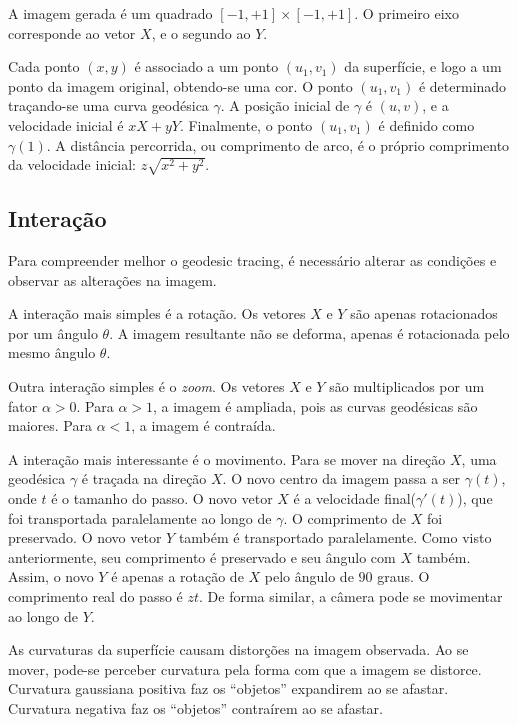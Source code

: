 A imagem gerada é um quadrado $[-1, +1] \times [-1, +1]$.
O primeiro eixo corresponde ao vetor $X$, e o segundo ao $Y$.

Cada ponto $(x,y)$ é associado a um ponto $(u_1, v_1)$ da superfície,
e logo a um ponto da imagem original, obtendo-se uma cor.
O ponto $(u_1, v_1)$ é determinado traçando-se uma curva geodésica $\gamma$.
A posição inicial de $\gamma$ é $(u,v)$, e a velocidade inicial é $xX+yY$.
Finalmente, o ponto $(u_1, v_1)$ é definido como $\gamma(1)$.
A distância percorrida, ou comprimento de arco, é o próprio comprimento
da velocidade inicial: $z\sqrt{x^2+y^2}$.

\subsection{Interação}
Para compreender melhor o geodesic tracing,
é necessário alterar as condições e observar as alterações na imagem.

A interação mais simples é a rotação.
Os vetores $X$ e $Y$ são apenas rotacionados por um ângulo $\theta$.
A imagem resultante não se deforma, apenas é rotacionada pelo mesmo ângulo $\theta$.

Outra interação simples é o \textit{zoom}.
Os vetores $X$ e $Y$ são multiplicados por um fator $\alpha > 0$.
Para $\alpha > 1$, a imagem é ampliada, pois as curvas geodésicas são maiores.
Para $\alpha < 1$, a imagem é contraída.

A interação mais interessante é o movimento.
Para se mover na direção $X$, uma geodésica $\gamma$ é traçada na direção $X$.
O novo centro da imagem passa a ser $\gamma(t)$, onde $t$ é o tamanho do passo.
O novo vetor $X$ é a velocidade final($\gamma'(t)$),
que foi transportada paralelamente ao longo
de $\gamma$. O comprimento de $X$ foi preservado.
O novo vetor $Y$ também é transportado paralelamente.
Como visto anteriormente, seu comprimento é preservado e seu ângulo com $X$ também.
Assim, o novo $Y$ é apenas a rotação de $X$ pelo ângulo de $90$ graus.
O comprimento real do passo é $zt$.
De forma similar, a câmera pode se movimentar ao longo de $Y$.

As curvaturas da superfície causam distorções na imagem observada.
Ao se mover, pode-se perceber curvatura pela forma com que a imagem se distorce.
Curvatura gaussiana positiva faz os ``objetos'' expandirem ao se afastar.
Curvatura negativa faz os ``objetos'' contraírem ao se afastar.